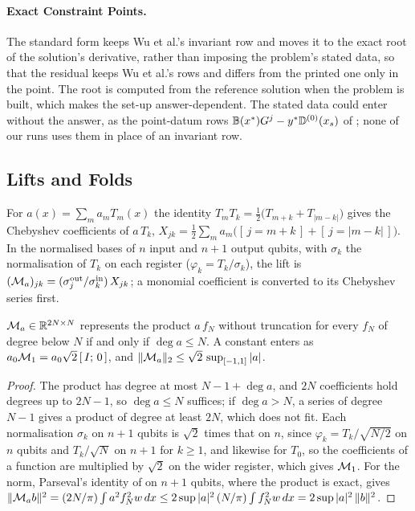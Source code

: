 \paragraph{Exact Constraint Points.} \label{app:exact-points}The standard form keeps Wu et al.'s invariant row and moves it to the exact root of the solution's derivative, rather than imposing the problem's stated data, so that the residual keeps Wu et al.'s rows and differs from the printed one only in the point. The root is computed from the reference solution when the problem is built, which makes the set-up answer-dependent. The stated data could enter without the answer, as the point-datum rows $\mathbb{B}(x^*)G^{j}-y^*\mathbb{D}^{(0)}(x_s)$ of ; none of our runs uses them in place of an invariant row.

\subsection{Lifts and Folds}
\label{app:lifts-folds}

For $a(x)=\sum_ma_mT_m(x)$ the identity $T_mT_k=\tfrac12\bigl(T_{m+k}+T_{|m-k|}\bigr)$ gives the Chebyshev coefficients of $a\,T_k$, $X_{jk}=\tfrac12\sum_ma_m\bigl([\,j=m+k\,]+[\,j=|m-k|\,]\bigr)$. In the normalised bases of $n$ input and $n+1$ output qubits, with $\sigma_k$ the normalisation of $T_k$ on each register ($\varphi_k=T_k/\sigma_k$), the lift is $(\mathcal{M}_a)_{jk}=(\sigma^{\mathrm{out}}_j/\sigma^{\mathrm{in}}_k)\,X_{jk}$; a monomial coefficient is converted to its Chebyshev series first.

\begin{proposition}
\label{prop:lift}
$\mathcal{M}_a\in\mathbb R^{2N\times N}$ represents the product $a\,f_N$ without truncation for every $f_N$ of degree below $N$ if and only if $\deg a\le N$. A constant enters as $a_0\mathcal{M}_1=a_0\sqrt2\,[\,I;\,0\,]$, and $\|\mathcal{M}_a\|_2\le\sqrt2\,\sup_{[-1,1]}|a|$.
\end{proposition}
\begin{proof}
The product has degree at most $N-1+\deg a$, and $2N$ coefficients hold degrees up to $2N-1$, so $\deg a\le N$ suffices; if $\deg a>N$, a series of degree $N-1$ gives a product of degree at least $2N$, which does not fit. Each normalisation $\sigma_k$ on $n+1$ qubits is $\sqrt2$ times that on $n$, since $\varphi_k=T_k/\sqrt{N/2}$ on $n$ qubits and $T_k/\sqrt N$ on $n+1$ for $k\ge1$, and likewise for $T_0$, so the coefficients of a function are multiplied by $\sqrt2$ on the wider register, which gives $\mathcal{M}_1$. For the norm, Parseval's identity of  on $n+1$ qubits, where the product is exact, gives $\|\mathcal{M}_ab\|^2=(2N/\pi)\int a^2f_N^2w\,dx\le2\sup|a|^2\,(N/\pi)\int f_N^2w\,dx=2\sup|a|^2\,\|b\|^2$.
\end{proof}

